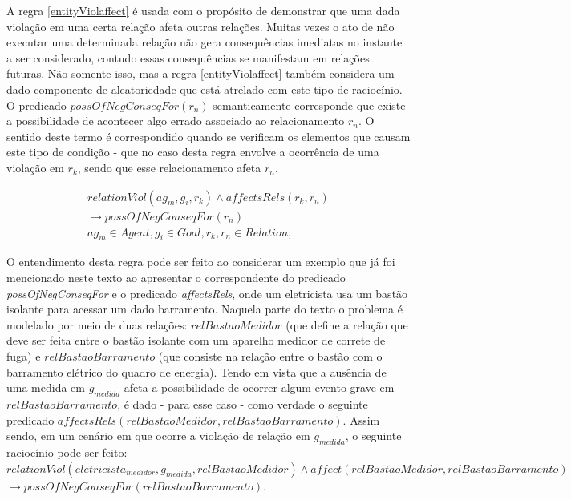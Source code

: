 A regra \ref{entityViolaffect} é usada com o propósito de demonstrar que uma dada violação em uma certa relação afeta outras relações. Muitas vezes o ato de não executar uma determinada relação não gera consequências imediatas no instante a ser considerado, contudo essas consequências se manifestam em relações futuras. Não somente isso, mas a regra \ref{entityViolaffect} também considera um dado componente de aleatoriedade que está atrelado com este tipo de raciocínio. O predicado $possOfNegConseqFor(r_n)$ semanticamente corresponde que existe a possibilidade de acontecer algo errado associado ao relacionamento $r_n$. O sentido deste termo é correspondido quando se verificam os elementos que causam este tipo de condição - que no caso desta regra envolve a ocorrência de uma violação em $r_k$, sendo que esse relacionamento afeta $r_n$.

\begin{eqnarray}\label{entityViolaffect}
	relationViol(ag_m,g_i,r_k) \wedge affectsRels(r_k,r_n) \nonumber \\
    \to possOfNegConseqFor(r_n)  \nonumber \\
    ag_m \in Agent, g_i \in Goal, r_k,r_n \in Relation, 
\end{eqnarray}

O entendimento desta regra pode ser feito ao considerar um exemplo que já foi mencionado neste texto ao apresentar o correspondente do predicado \textit{possOfNegConseqFor} e o predicado \textit{affectsRels}, onde um eletricista usa um bastão isolante para acessar um dado barramento. Naquela parte do texto o problema é modelado por meio de duas relações: $relBastaoMedidor$ (que define a relação que deve ser feita entre o bastão isolante com um aparelho medidor de correte de fuga) e $relBastaoBarramento$ (que consiste na relação entre o bastão com o barramento elétrico do quadro de energia). Tendo em vista que a ausência de uma medida em $g_{medida}$ afeta a possibilidade de ocorrer algum evento grave em $relBastaoBarramento$, é dado - para esse caso - como verdade o seguinte predicado $affectsRels(relBastaoMedidor, relBastaoBarramento)$. Assim sendo, em um cenário em que ocorre a violação de relação em $g_{medida}$, o seguinte raciocínio pode ser feito: $relationViol(eletricista_{medidor},g_{medida},relBastaoMedidor) \wedge affect(relBastaoMedidor, relBastaoBarramento) $ \\ $\to  possOfNegConseqFor(relBastaoBarramento)$.   

